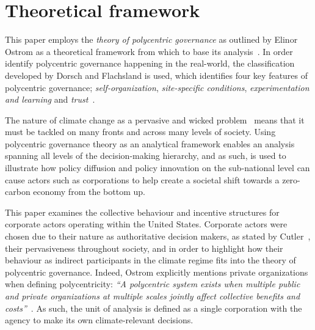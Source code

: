 \section{Theoretical framework} %

This paper employs the \textit{theory of polycentric governance} as
outlined by Elinor Ostrom as a theoretical framework from which to
base its analysis~\citep{ostrom2009polycentric}. In order identify
polycentric governance happening in the real-world, the classification
developed by Dorsch and Flachsland is used, which identifies four key
features of polycentric governance; \textit{self-organization},
\textit{site-specific conditions}, \textit{experimentation and
  learning} and \textit{trust}~\citep{dorsch2017polycentric}.

The nature of climate change as a pervasive and wicked
problem~\citep{marshall2015don} means that it must be tackled on many
fronts and across many levels of society. Using polycentric governance
theory as an analytical framework enables an analysis spanning all
levels of the decision-making hierarchy, and as such, is used to
illustrate how policy diffusion and policy innovation on the
sub-national level can cause actors such as corporations to help
create a societal shift towards a zero-carbon economy from the bottom
up.

This paper examines the collective behaviour and incentive structures
for corporate actors operating within the United States. Corporate
actors were chosen due to their nature as authoritative decision
makers, as stated by Cutler~\citep{cutler1999private}, their
pervasiveness throughout society, and in order to highlight how their
behaviour as indirect participants in the climate regime fits into the
theory of polycentric governance. Indeed, Ostrom explicitly mentions
private organizations when defining polycentricity: \textit{``A
  polycentric system exists when multiple public and private
  organizations at multiple scales jointly affect collective benefits
  and costs''}~\citep{cole2011global}. As such, the unit of analysis
is defined as a single corporation with the agency to make its own
climate-relevant decisions.

